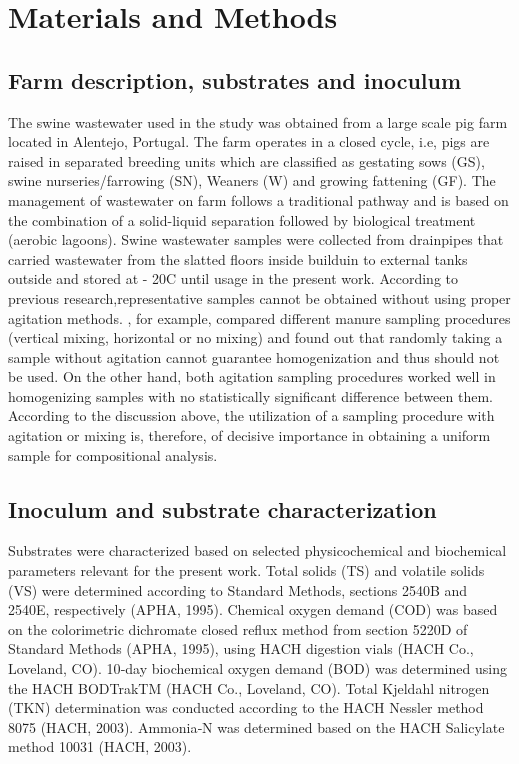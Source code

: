 \section{Materials and Methods}
\subsection{Farm description, substrates and inoculum}
The swine wastewater used in the study was obtained from a large scale pig farm located in Alentejo, Portugal. The farm operates in a closed cycle, i.e, pigs are raised in separated breeding units which are classified as gestating sows (GS), swine nurseries/farrowing (SN), Weaners (W) and growing fattening (GF). The management of wastewater on farm follows a traditional pathway and is based on the combination of a solid-liquid separation followed by biological treatment (aerobic lagoons). Swine wastewater samples were collected from drainpipes that carried wastewater from the slatted floors inside builduin to external tanks outside and stored at - 20\textdegree C until usage in the present work. According to previous research,representative samples cannot be obtained without using proper agitation methods. \cite{Zhu_2004}, for example, compared different manure sampling procedures (vertical mixing, horizontal or no mixing) and found out that randomly taking a sample without agitation cannot guarantee homogenization and thus should not be used. On the other hand, both agitation sampling procedures worked well in homogenizing samples with no statistically significant difference between them.  According to the discussion above, the utilization of a sampling procedure with agitation or mixing is, therefore, of decisive importance in obtaining a uniform sample for compositional analysis.
\subsection{Inoculum and substrate characterization}
Substrates were characterized based on selected physicochemical and biochemical parameters relevant for the present work. Total solids (TS) and volatile solids (VS) were determined according to Standard Methods, sections 2540B and 2540E, respectively (APHA, 1995). Chemical oxygen demand (COD) was based on the colorimetric dichromate closed reflux method from section 5220D of Standard Methods (APHA, 1995), using HACH digestion vials (HACH Co., Loveland, CO). 10‐day biochemical oxygen demand (BOD) was determined using the HACH BODTrakTM (HACH Co., Loveland, CO). Total Kjeldahl nitrogen (TKN) determination was conducted according to the HACH Nessler method 8075 (HACH, 2003). Ammonia‐N was determined based on the HACH Salicylate method 10031 (HACH, 2003). 
